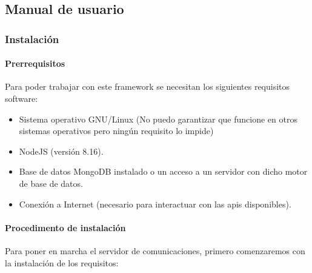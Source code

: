 \documentclass[spanish,12pt, a4paper, twoside]{paper}
\begin{document}
\subsection{Manual de usuario}

\subsubsection{Instalación}

\paragraph{Prerrequisitos}

Para poder trabajar con este framework se necesitan los siguientes requisitos software:

\begin{itemize}
\item Sistema operativo GNU/Linux (No puedo garantizar que funcione en otros sistemas operativos pero ningún requisito lo impide)
\item NodeJS (versión 8.16).
\item Base de datos MongoDB instalado o un acceso a un servidor con dicho motor de base de datos.
\item Conexión a Internet (necesario para interactuar con las apis disponibles).
\end{itemize}

\paragraph{Procedimento de instalación}

Para poner en marcha el servidor de comunicaciones, primero comenzaremos con la instalación de los requisitos:
\end{document}
